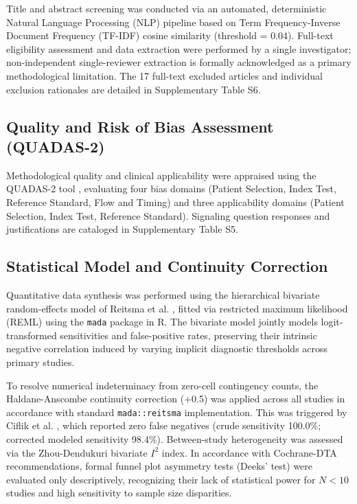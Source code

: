 \documentclass[preprint,11pt]{elsarticle}
\begin{document}
Title and abstract screening was conducted via an automated, deterministic Natural Language Processing (NLP) pipeline based on Term Frequency-Inverse Document Frequency (TF-IDF) cosine similarity (threshold = 0.04). Full-text eligibility assessment and data extraction were performed by a single investigator; non-independent single-reviewer extraction is formally acknowledged as a primary methodological limitation. The 17 full-text excluded articles and individual exclusion rationales are detailed in Supplementary Table S6.

\subsection{Quality and Risk of Bias Assessment (QUADAS-2)}
Methodological quality and clinical applicability were appraised using the QUADAS-2 tool \cite{whiting}, evaluating four bias domains (Patient Selection, Index Test, Reference Standard, Flow and Timing) and three applicability domains (Patient Selection, Index Test, Reference Standard). Signaling question responses and justifications are cataloged in Supplementary Table S5.

\subsection{Statistical Model and Continuity Correction}
Quantitative data synthesis was performed using the hierarchical bivariate random-effects model of Reitsma et al. \cite{reitsma}, fitted via restricted maximum likelihood (REML) using the \texttt{mada} package in R. The bivariate model jointly models logit-transformed sensitivities and false-positive rates, preserving their intrinsic negative correlation induced by varying implicit diagnostic thresholds across primary studies. 

To resolve numerical indeterminacy from zero-cell contingency counts, the Haldane-Anscombe continuity correction (+0.5) was applied across all studies in accordance with standard \texttt{mada::reitsma} implementation. This was triggered by Ciflik et al. \cite{ciflik}, which reported zero false negatives (crude sensitivity 100.0\%; corrected modeled sensitivity 98.4\%). Between-study heterogeneity was assessed via the Zhou-Dendukuri bivariate $I^2$ index. In accordance with Cochrane-DTA recommendations, formal funnel plot asymmetry tests (Deeks' test) were evaluated only descriptively, recognizing their lack of statistical power for $N < 10$ studies and high sensitivity to sample size disparities.
\end{document}
